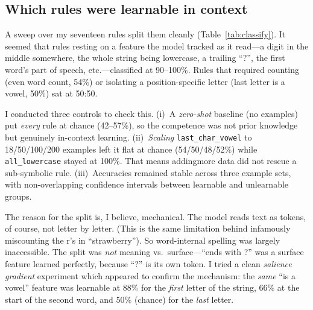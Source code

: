 \documentclass[10pt,twocolumn]{article}
\newcommand{\rulename}[1]{\texttt{#1}}
\begin{document}
\subsection{Which rules were learnable in context}
A sweep over my seventeen rules split them cleanly (Table~\ref{tab:classify}). It seemed that rules resting on a feature the model tracked as it read---a digit in the middle somewhere, the whole
string being lowercase, a trailing ``?'', the first word's part of speech, etc.---classified at
90--100\%. Rules that required counting (even word count, 54\%) or isolating a
position-specific letter (last letter is a vowel, 50\%) sat at 50:50.

I conducted three controls to check this. (i)~A \emph{zero-shot} baseline (no examples) put \emph{every} rule at
chance (42--57\%), so the competence was not prior knowledge but genuinely in-context learning.
(ii)~\emph{Scaling} \rulename{last\_char\_vowel} to 18/50/100/200 examples left it flat
at chance (54/50/48/52\%) while \rulename{all\_lowercase} stayed at 100\%. That means addingmore data did
not rescue a sub-symbolic rule. (iii)~Accuracies remained stable across three example sets, with
non-overlapping confidence intervals between learnable and unlearnable groups.

The reason for the split is, I believe, mechanical. The model reads text as tokens, of course, not
letter by letter. (This is the same limitation behind infamously miscounting the r's in ``strawberry''). So 
word-internal spelling was largely inaccessible. The split was \emph{not} meaning vs.\
surface---``ends with ?'' was a surface feature learned perfectly, because ``?'' is its
own token. I tried a clean \emph{salience gradient} experiment which appeared to confirm the mechanism: the \emph{same}
``is a vowel'' feature was learnable at 88\% for the \emph{first} letter of the string,
66\% at the start of the second word, and 50\% (chance) for the \emph{last} letter.
\end{document}
